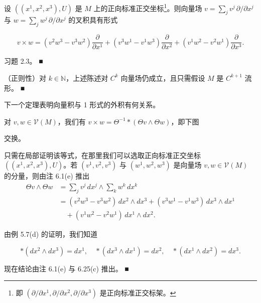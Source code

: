\begin{remark}
\begin{items}
设 $ ((x^{1},x^{2},x^{3}),U) $ 是 $ M $ 上的正向标准正交坐标\footnote{即 $ (\partial/\partial x^{1},\partial/\partial x^{2},\partial/\partial x^{3}) $ 是正向标准正交标架。}。则向量场 $ v = \sum_{j} v^{j}\, \partial/\partial x^{j} $ 与 $ w = \sum_{j} w^{j}\, \partial/\partial x^{j} $ 的叉积具有形式

\[
v\times w = (v^{2}w^{3} - v^{3}w^{2})\frac{\partial}{\partial x^{1}} + (v^{3}w^{1} - v^{1}w^{3})\frac{\partial}{\partial x^{2}} + (v^{1}w^{2} - v^{2}w^{1})\frac{\partial}{\partial x^{3}} .
\]

\proofhead
习题 2.3。 \nobreak\hspace{0.35em}■
\item

（正则性）对 $ k \in \mathbb{N} $，上述陈述对 $ C^{k} $ 向量场仍成立，且只需假设 $ M $ 是 $ C^{k+1} $ 流形。 \nobreak\hspace{0.35em}■

\end{items}

下一个定理表明向量积与 1 形式的外积有何关系。

\end{remark}

\begin{proposition}

对 $ v, w \in \mathcal{V}(M) $，我们有 $ v\times w = \Theta^{-1}\ast(\Theta v\wedge\Theta w) $，即下图


交换。

\proofhead
只需在局部证明该等式，在那里我们可以选取正向标准正交坐标 $ ((x^{1},x^{2},x^{3}),U) $。若 $ (v^{1},v^{2},v^{3}) $ 与 $ (w^{1},w^{2},w^{3}) $ 是向量场 $ v, w \in \mathcal{V}(M) $ 的分量，则由注 6.1(e) 推出
\begin{equation*}
\begin{aligned}
\Theta v\wedge\Theta w &= \sum_{j} v^{j}\, dx^{j} \wedge \sum_{k} w^{k}\, dx^{k} \\ &= (v^{2}w^{3} - v^{3}w^{2})\, dx^{2}\wedge dx^{3} + (v^{3}w^{1} - v^{1}w^{3})\, dx^{3}\wedge dx^{1} \\ &\quad + (v^{1}w^{2} - v^{2}w^{1})\, dx^{1}\wedge dx^{2} .
\end{aligned}
\end{equation*}

由例 5.7(d) 的证明，我们知道

\begin{equation}
\ast(dx^{2}\wedge dx^{3}) = dx^{1}, \quad \ast(dx^{3}\wedge dx^{1}) = dx^{2}, \quad \ast(dx^{1}\wedge dx^{2}) = dx^{3} .\tag{6.39}
\end{equation}

现在结论由注 6.1(e) 与 6.25(c) 推出。 \nobreak\hspace{0.35em}■

\end{proposition}

